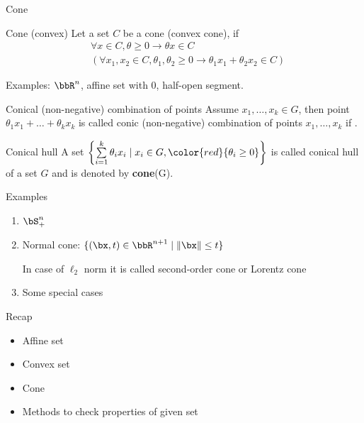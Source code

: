 \documentclass[12pt,russian]{beamer}
\begin{document}
\begin{frame}{Cone}
\small
\begin{block}{Cone (convex)}
Let a set $C$ be a cone (convex cone), if 
\vspace{-4mm}
\begin{equation*}
\begin{split}
& \forall x \in C, \theta \geq 0 \rightarrow \theta x \in C \\
& (\forall x_1, x_2 \in C, \theta_1, \theta_2 \geq 0 \rightarrow \theta_1 x_1 + \theta_2 x_2 \in C)
\end{split}
\end{equation*}
\vspace{-4mm}
\end{block}
Examples: $\bbR^n$, affine set with 0, half-open segment.
\begin{block}{Conical (non-negative) combination of points}
Assume $x_1, \ldots, x_k \in G$, then point $\theta_1 x_1 + \ldots + \theta_k x_k$ is called conic (non-negative) combination of points $x_1,\ldots,x_k$ if {\color{red}{$\theta_i \geq 0$}}.
\end{block}

\begin{block}{Conical hull}
A set $\left\{ \sum\limits_{i=1}^k \theta_i x_i \; | \; x_i \in G, {\color{red}{\theta_i \geq 0}} \right\}$ is called conical hull of a set $G$ and is denoted by \textbf{cone}(G).
\end{block}
\end{frame}

\begin{frame}{Examples}
\begin{enumerate}
\item $\bS^n_+$
\item Normal cone: $\{ (\bx, t) \in \bbR^{n+1} \; | \; \| \bx \| \leq t \}$ 

In case of $\ell_2$ norm it is called second-order cone or Lorentz cone
\item Some special cases
\end{enumerate}
\end{frame}

\begin{frame}{Recap}
\begin{itemize}
\item Affine set
\item Convex set
\item Cone
\item Methods to check properties of given set
\end{itemize}
\end{frame}
\end{document}
